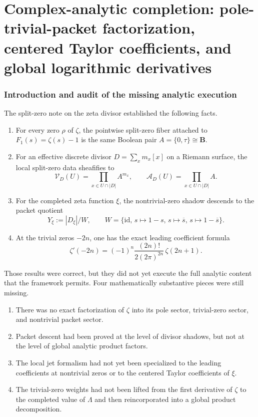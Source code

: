 \documentclass[11pt,a4paper]{article}
\numberwithin{equation}{section}
\theoremstyle{definition}
\theoremstyle{remark}
\newcommand{\BB}{\mathbf B}
\newcommand{\cV}{\mathcal V}
\newcommand{\cA}{\mathcal A}
\newcommand{\setpartprefix}[1]{\def\partprefix{#1}\setcounter{section}{0}}
\def\partprefix{0}
\begin{document}
\part{Complex-analytic completion: pole-trivial-packet factorization, centered Taylor coefficients, and global logarithmic derivatives}
\setpartprefix{II}

\section{Introduction and audit of the missing analytic execution}

The split-zero note on the zeta divisor established the following facts.

\begin{enumerate}[label=(\roman*)]
\item For every zero $\rho$ of $\zeta$, the pointwise split-zero fiber attached to $F_1(s)=\zeta(s)-1$ is the same Boolean pair $A=\{0,\tau\}\cong\BB$.
\item For an effective discrete divisor $D=\sum_x m_x[x]$ on a Riemann surface, the local split-zero data sheafifies to
\[
\cV_D(U)=\prod_{x\in U\cap |D|} A^{m_x},
\qquad
\cA_D(U)=\prod_{x\in U\cap |D|} A.
\]
\item For the completed zeta function $\xi$, the nontrivial-zero shadow descends to the packet quotient
\[
Y_\xi:=|D_\xi|/W,
\qquad
W=\{\mathrm{id},\,s\mapsto 1-s,\,s\mapsto \overline s,\,s\mapsto 1-\overline s\}.
\]
\item At the trivial zeros $-2n$, one has the exact leading coefficient formula
\[
\zeta'(-2n)=(-1)^n\frac{(2n)!}{2(2\pi)^{2n}}\,\zeta(2n+1).
\]
\end{enumerate}

Those results were correct, but they did not yet execute the full analytic content that the framework permits.  Four mathematically substantive pieces were still missing.

\begin{enumerate}[label=(A)]
\item There was no exact factorization of $\zeta$ into its pole sector, trivial-zero sector, and nontrivial packet sector.
\item Packet descent had been proved at the level of divisor shadows, but not at the level of global analytic product factors.
\item The local jet formalism had not yet been specialized to the leading coefficients at nontrivial zeros or to the centered Taylor coefficients of $\xi$.
\item The trivial-zero weights had not been lifted from the first derivative of $\zeta$ to the completed value of $\Lambda$ and then reincorporated into a global product decomposition.
\end{enumerate}
\end{document}
